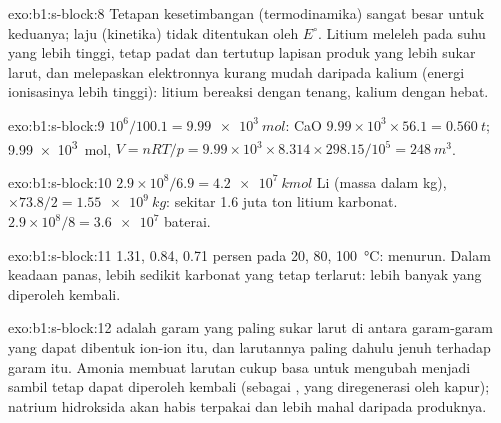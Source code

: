 \begin{solution}{exo:b1:s-block:8}
Tetapan kesetimbangan (termodinamika) sangat besar untuk keduanya; laju
(kinetika) tidak ditentukan oleh $E^\circ$. Litium meleleh pada suhu yang
lebih tinggi, tetap padat dan tertutup lapisan produk yang lebih sukar
larut, dan melepaskan elektronnya kurang mudah daripada kalium (energi
ionisasinya lebih tinggi): litium bereaksi dengan tenang, kalium dengan
hebat.
\end{solution}

\begin{solution}{exo:b1:s-block:9}
$10^6/100.1 = \qty{9.99e3}{mol}$: CaO $9.99 \times 10^3 \times 56.1 =
\qty{0.560}{t}$;  \qty{9.99e3}{mol}, $V = nRT/p = 9.99 \times 10^3
\times 8.314 \times 298.15/10^5 = \qty{248}{m^3}$.
\end{solution}

\begin{solution}{exo:b1:s-block:10}
$2.9 \times 10^8/6.9 = \qty{4.2e7}{kmol}$ Li (massa dalam kg), $\times 73.8/2 =
\qty{1.55e9}{kg}$: sekitar 1.6 juta ton litium karbonat.
$2.9 \times 10^8/8 = \num{3.6e7}$ baterai.
\end{solution}

\begin{solution}{exo:b1:s-block:11}
1.31, 0.84, 0.71 persen pada 20, 80, \qty{100}{\celsius}: 
menurun. Dalam keadaan panas, lebih sedikit karbonat yang tetap terlarut:
lebih banyak yang diperoleh kembali.
\end{solution}

\begin{solution}{exo:b1:s-block:12}
 adalah garam yang paling sukar larut di antara garam-garam
yang dapat dibentuk ion-ion itu, dan larutannya paling dahulu jenuh
terhadap garam itu. Amonia membuat larutan cukup basa untuk mengubah
 menjadi  sambil tetap dapat diperoleh kembali (sebagai
, yang diregenerasi oleh kapur); natrium hidroksida akan habis
terpakai dan lebih mahal daripada produknya.
\end{solution}

